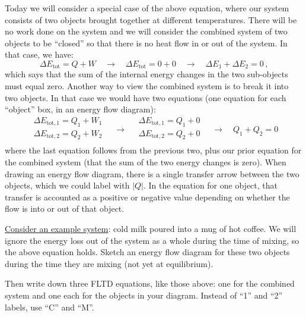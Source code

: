 Today we will consider a special case of the above equation, where our system consists of two objects brought together at different temperatures.  There will be no work done on the system and we will consider the combined system of two objects to be ``closed'' so that there is no heat flow in or out of the system.  In that case, we have:
	\begin{equation*}
	\Delta E_\text{tot}  = Q + W  \quad \rightarrow \quad \Delta E_\text{tot} = 0 + 0 \quad \rightarrow \quad \Delta E_1 + \Delta E_2 = 0\, ,
	\end{equation*}
which says that the sum of the internal energy changes in the two sub-objects must equal zero.  Another way to view the combined system is to break it into two objects.  In that case we would have two equations (one equation for each ``object'' box, in an energy flow diagram):
	\begin{equation*}
	\begin{array}{c}
	\Delta E_{\text{tot}, 1}  = Q_1 + W_1 \\
	\Delta E_{\text{tot}, 2}  = Q_2 + W_2 \\
	\end{array} 
	\quad \rightarrow \quad
	\begin{array}{c}
	\Delta E_{\text{tot}, 1}  = Q_1 + 0 \\
	\Delta E_{\text{tot}, 2}  = Q_2 + 0 \\
	\end{array} 
	\quad \rightarrow \quad
	Q_1 + Q_2 = 0
	\end{equation*}
where the last equation follows from the previous two, plus our prior equation for the combined system (that the sum of the two energy changes is zero).  When drawing an energy flow diagram, there is a single transfer arrow between the two objects, which we could label with $|Q|$.  In the equation for one object, that transfer is accounted as a positive or negative value depending on whether the flow is into or out of  that object.

\underline{Consider an example system}: cold milk poured into a mug of hot coffee. We will ignore the energy loss out of the system as a whole during the time of mixing, so the above equation holds.  Sketch an energy flow diagram for these two objects during the time they are mixing (not yet at equilibrium).  

\answerspace[2cm]

Then write down three FLTD equations, like those above: one for the combined system and one each for the objects in your diagram.  Instead of ``1'' and ``2'' labels, use ``C'' and ``M''. 

